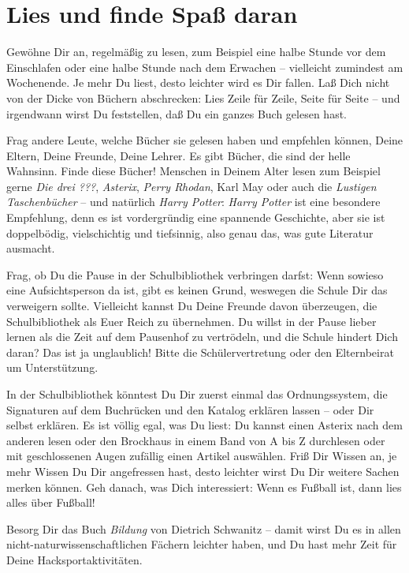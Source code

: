 
\chapter{Lies und finde Spaß daran}

Gewöhne Dir an, regelmäßig zu lesen, zum Beispiel eine halbe Stunde vor dem Einschlafen oder eine halbe Stunde nach dem Erwachen – vielleicht zumindest am Wochenende. Je mehr Du liest, desto leichter wird es Dir fallen. Laß Dich nicht von der Dicke von Büchern abschrecken: Lies Zeile für Zeile, Seite für Seite – und irgendwann wirst Du feststellen, daß Du ein ganzes Buch gelesen hast. 

Frag andere Leute, welche Bücher sie gelesen haben und empfehlen können, Deine Eltern, Deine Freunde, Deine Lehrer. Es gibt Bücher, die sind der helle Wahnsinn. Finde diese Bücher! Menschen in Deinem Alter lesen zum Beispiel gerne \emph{Die drei ???}, \emph{Asterix}, \emph{Perry Rhodan}, Karl May oder auch die \emph{Lustigen Taschenbücher} – und natürlich \emph{Harry Potter}: \emph{Harry Potter} ist eine besondere Empfehlung, denn es ist vordergründig eine spannende Geschichte, aber sie ist doppelbödig, vielschichtig und tiefsinnig, also genau das, was gute Literatur ausmacht.

Frag, ob Du die Pause in der Schulbibliothek verbringen darfst: Wenn sowieso eine Aufsichtsperson da ist, gibt es keinen Grund, weswegen die Schule Dir das verweigern sollte. Vielleicht kannst Du Deine Freunde davon überzeugen, die Schulbibliothek als Euer Reich zu übernehmen. Du willst in der Pause lieber lernen als die Zeit auf dem Pausenhof zu vertrödeln, und die Schule hindert Dich daran? Das ist ja unglaublich! Bitte die Schülervertretung oder den Elternbeirat um Unterstützung.

In der Schulbibliothek könntest Du Dir zuerst einmal das Ordnungssystem, die Signaturen auf dem Buchrücken und den Katalog erklären lassen – oder Dir selbst erklären. Es ist völlig egal, was Du liest: Du kannst einen Asterix nach dem anderen lesen oder den Brockhaus in einem Band von A bis Z durchlesen oder mit geschlossenen Augen zufällig einen Artikel auswählen. Friß Dir Wissen an, je mehr Wissen Du Dir angefressen hast, desto leichter wirst Du Dir weitere Sachen merken können. Geh danach, was Dich interessiert: Wenn es Fußball ist, dann lies alles über Fußball!

Besorg Dir das Buch \emph{Bildung} von Dietrich Schwanitz – damit wirst Du es in allen nicht-naturwissenschaftlichen Fächern leichter haben, und Du hast mehr Zeit für Deine Hacksportaktivitäten.
